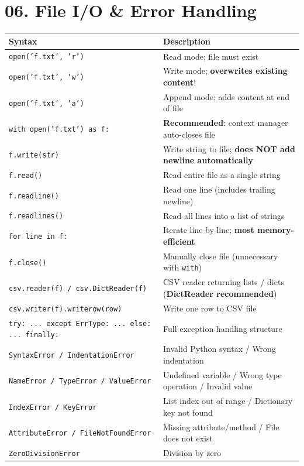 \documentclass[11pt,a4paper]{report}
\let\oldtexttt\texttt
\renewcommand{\texttt}[1]{\textcolor{mainblue}{\oldtexttt{#1}}}
\begin{document}
\section*{06. File I/O \& Error Handling}
\small\renewcommand{\arraystretch}{1.3}
\centering
\begin{tabularx}{\textwidth}{@{}lX@{}}
\toprule
\textbf{Syntax} & \textbf{Description} \\ \midrule
\texttt{open('f.txt', 'r')} & Read mode; file must exist \\
\texttt{open('f.txt', 'w')} & Write mode; \textbf{overwrites existing content}! \\
\texttt{open('f.txt', 'a')} & Append mode; adds content at end of file \\
\texttt{with open('f.txt') as f:} & \textbf{Recommended}: context manager auto-closes file \\
\texttt{f.write(str)} & Write string to file; \textbf{does NOT add newline automatically} \\
\texttt{f.read()} & Read entire file as a single string \\
\texttt{f.readline()} & Read one line (includes trailing newline) \\
\texttt{f.readlines()} & Read all lines into a list of strings \\
\texttt{for line in f:} & Iterate line by line; \textbf{most memory-efficient} \\
\texttt{f.close()} & Manually close file (unnecessary with \texttt{with}) \\
\texttt{csv.reader(f) / csv.DictReader(f)} & CSV reader returning lists / dicts (\textbf{DictReader recommended}) \\
\texttt{csv.writer(f).writerow(row)} & Write one row to CSV file \\
\texttt{try: ... except ErrType: ... else: ... finally:} & Full exception handling structure \\
\texttt{SyntaxError / IndentationError} & Invalid Python syntax / Wrong indentation \\
\texttt{NameError / TypeError / ValueError} & Undefined variable / Wrong type operation / Invalid value \\
\texttt{IndexError / KeyError} & List index out of range / Dictionary key not found \\
\texttt{AttributeError / FileNotFoundError} & Missing attribute/method / File does not exist \\
\texttt{ZeroDivisionError} & Division by zero \\
\bottomrule
\end{tabularx}
\normalsize
\end{document}
